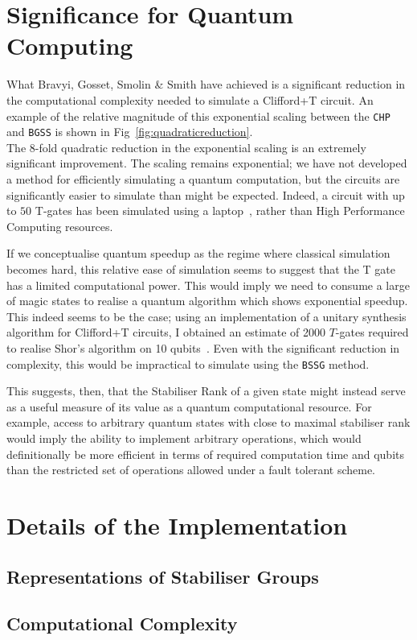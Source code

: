 \documentclass{standalone}
\begin{document}
\section{Significance for Quantum Computing}\label{sec:whybgss}
What Bravyi, Gosset, Smolin \& Smith have achieved is a significant reduction in the computational complexity needed to simulate a Clifford+T circuit. An example of the relative magnitude of this exponential scaling between the \texttt{CHP} and \texttt{BGSS} is shown in Fig~\ref{fig:quadraticreduction}. \\
The 8-fold quadratic reduction in the exponential scaling is an extremely significant improvement. The scaling remains exponential; we have not developed a method for efficiently simulating a quantum computation, but the circuits are significantly easier to simulate than might be expected. Indeed, a circuit with up to $50$ T-gates has been simulated using a laptop~\cite{Bravyi2015}, rather than High Performance Computing resources. 
\par
If we conceptualise quantum speedup as the regime where classical simulation becomes hard, this relative ease of simulation seems to suggest that the T gate has a limited computational power. This would imply we need to consume a large of magic states to realise a quantum algorithm which shows exponential speedup.\\

This indeed seems to be the case; using an implementation of a unitary synthesis algorithm for Clifford+T circuits, I obtained an estimate of 2000 $T$-gates required to realise Shor's algorithm on 10 qubits~\cite{Selinger2012}. Even with the significant reduction in complexity, this would be impractical to simulate using the \texttt{BSSG} method. 
\par
This suggests, then, that the Stabiliser Rank of a given state might instead serve as a useful measure of its value as a quantum computational resource. For example, access to arbitrary quantum states with close to maximal stabiliser rank would imply the ability to implement arbitrary operations, which would definitionally be more efficient in terms of required computation time and qubits than the restricted set of operations allowed under a fault tolerant scheme. 

\section{Details of the Implementation}
\subsection{Representations of Stabiliser Groups}
\subsection{Computational Complexity}
\ifstandalone

\fi
\end{document}
